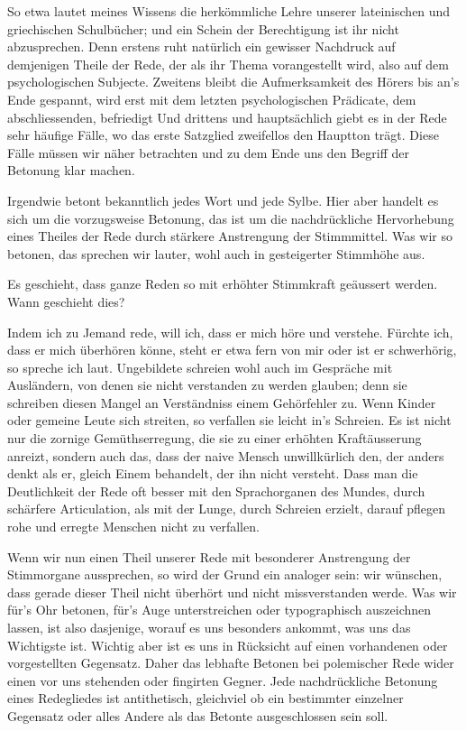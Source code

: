 So etwa lautet meines Wissens die herkömmliche Lehre unserer lateinischen und griechischen Schulbücher; und ein Schein der Berechtigung ist ihr nicht abzusprechen. Denn erstens ruht natürlich ein gewisser Nachdruck auf demjenigen Theile der Rede, der als ihr Thema vorangestellt wird, also auf dem psychologischen Subjecte. Zweitens bleibt die Aufmerksamkeit des Hörers bis an’s Ende gespannt, wird erst mit dem letzten psychologischen Prädicate, dem abschliessenden, befriedigt Und drittens und hauptsächlich giebt es in der Rede sehr häufige Fälle, wo das erste Satzglied zweifellos den Hauptton trägt. Diese Fälle müssen wir näher betrachten und zu dem Ende uns den Begriff der Betonung klar machen. 


Irgendwie betont  bekanntlich jedes Wort und jede Sylbe. Hier aber handelt es sich um die vorzugsweise Betonung, das ist um die nachdrückliche \label{sp.374} Hervorhebung eines Theiles der Rede durch stärkere Anstrengung der Stimmmittel. Was wir so betonen, das sprechen wir lauter, wohl auch in gesteigerter Stimmhöhe aus.

Es geschieht, dass ganze Reden so mit erhöhter Stimmkraft geäussert werden. Wann geschieht dies?

Indem ich zu Jemand rede, will ich, dass er mich höre und verstehe. Fürchte ich, dass er mich überhören könne, steht er etwa fern \label{fp.358} von mir oder ist er schwerhörig, so spreche ich laut. Ungebildete schreien wohl auch im Gespräche mit Ausländern, von denen sie nicht verstanden zu werden glauben; denn sie schreiben diesen Mangel an Verständniss einem Gehörfehler zu. Wenn Kinder oder gemeine Leute sich streiten, so verfallen sie leicht in’s Schreien. Es ist nicht nur die zornige Gemüthserregung, die sie zu einer erhöhten Kraftäusserung anreizt, sondern auch das, dass der naive Mensch unwillkürlich den, der anders denkt als er, gleich Einem behandelt, der ihn nicht versteht. Dass man die Deutlichkeit der Rede oft besser mit den Sprachorganen des Mundes, durch schärfere Articulation, als mit der Lunge, durch Schreien erzielt, darauf pflegen rohe und erregte Menschen nicht zu verfallen.

Wenn wir nun einen Theil unserer Rede mit besonderer Anstrengung der Stimm\-organe aussprechen, so wird der Grund ein analoger sein: wir wünschen, dass gerade dieser Theil nicht überhört und nicht missverstanden werde. Was wir für’s Ohr betonen, für’s Auge unterstreichen oder typographisch auszeichnen lassen, ist also dasjenige, worauf es uns besonders ankommt, was uns das Wichtigste ist. Wichtig aber ist es uns in Rücksicht auf einen vorhandenen oder vorgestellten Gegensatz. Daher das lebhafte Betonen bei polemischer Rede wider einen vor uns stehenden oder fingirten Gegner. Jede nachdrückliche Betonung eines Redegliedes ist antithetisch, gleichviel ob ein bestimmter einzelner Gegensatz oder alles Andere als das Betonte ausgeschlossen sein soll.


